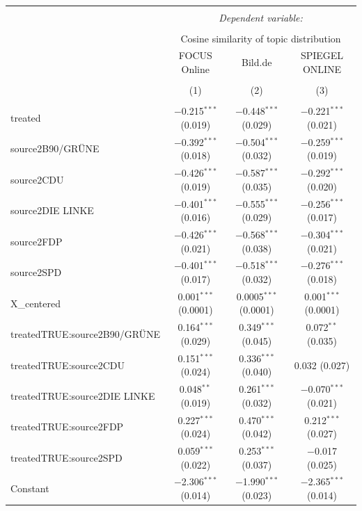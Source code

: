 \documentclass[
]{article}
\begin{document}
\begin{table}[!htbp] \centering 
  \caption{} 
  \label{} 
\tiny 
\begin{tabular}{@{\extracolsep{5pt}}lccc} 
\\[-1.8ex]\hline 
\hline \\[-1.8ex] 
 & \multicolumn{3}{c}{\textit{Dependent variable:}} \\ 
\cline{2-4} 
\\[-1.8ex] & \multicolumn{3}{c}{Cosine similarity of topic distribution} \\ 
 & FOCUS Online & Bild.de & SPIEGEL ONLINE \\ 
\\[-1.8ex] & (1) & (2) & (3)\\ 
\hline \\[-1.8ex] 
 treated & $-$0.215$^{***}$ (0.019) & $-$0.448$^{***}$ (0.029) & $-$0.221$^{***}$ (0.021) \\ 
  source2B90/GRÜNE & $-$0.392$^{***}$ (0.018) & $-$0.504$^{***}$ (0.032) & $-$0.259$^{***}$ (0.019) \\ 
  source2CDU & $-$0.426$^{***}$ (0.019) & $-$0.587$^{***}$ (0.035) & $-$0.292$^{***}$ (0.020) \\ 
  source2DIE LINKE & $-$0.401$^{***}$ (0.016) & $-$0.555$^{***}$ (0.029) & $-$0.256$^{***}$ (0.017) \\ 
  source2FDP & $-$0.426$^{***}$ (0.021) & $-$0.568$^{***}$ (0.038) & $-$0.304$^{***}$ (0.021) \\ 
  source2SPD & $-$0.401$^{***}$ (0.017) & $-$0.518$^{***}$ (0.032) & $-$0.276$^{***}$ (0.018) \\ 
  X\_centered & 0.001$^{***}$ (0.0001) & 0.0005$^{***}$ (0.0001) & 0.001$^{***}$ (0.0001) \\ 
  treatedTRUE:source2B90/GRÜNE & 0.164$^{***}$ (0.029) & 0.349$^{***}$ (0.045) & 0.072$^{**}$ (0.035) \\ 
  treatedTRUE:source2CDU & 0.151$^{***}$ (0.024) & 0.336$^{***}$ (0.040) & 0.032 (0.027) \\ 
  treatedTRUE:source2DIE LINKE & 0.048$^{**}$ (0.019) & 0.261$^{***}$ (0.032) & $-$0.070$^{***}$ (0.021) \\ 
  treatedTRUE:source2FDP & 0.227$^{***}$ (0.024) & 0.470$^{***}$ (0.042) & 0.212$^{***}$ (0.027) \\ 
  treatedTRUE:source2SPD & 0.059$^{***}$ (0.022) & 0.253$^{***}$ (0.037) & $-$0.017 (0.025) \\ 
  Constant & $-$2.306$^{***}$ (0.014) & $-$1.990$^{***}$ (0.023) & $-$2.365$^{***}$ (0.014) \\ 

\end{tabular}
\end{table}
\end{document}
